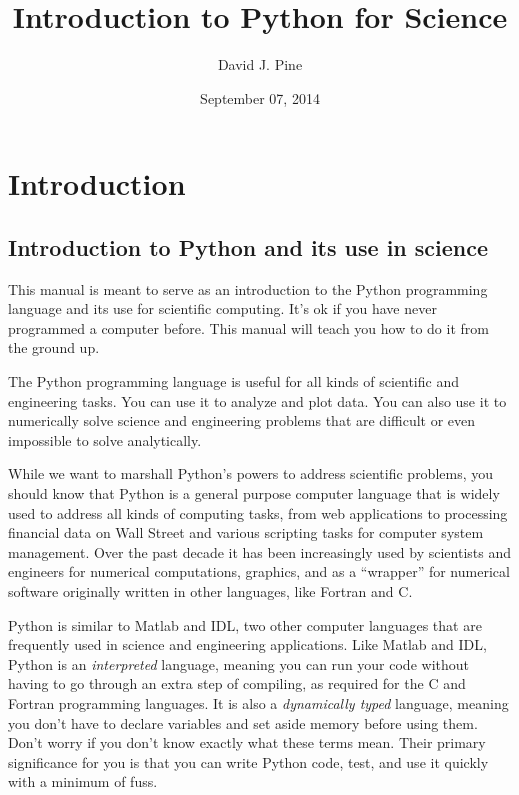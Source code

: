 \documentclass[letterpaper,10pt,english]{sphinxmanual}
\title{Introduction to Python for Science}
\date{September 07, 2014}
\author{David J. Pine}
\begin{document}
\maketitle
\tableofcontents
{}\label{latex-contents::doc}



\chapter{Introduction}
\label{chap1/chap1_intro:introduction}\label{chap1/chap1_intro:welcome-to-pyman-s-documentation}\label{chap1/chap1_intro::doc}

\section{Introduction to Python and its use in science}
\label{chap1/chap1_intro:introduction-to-python-and-its-use-in-science}
This manual is meant to serve as an introduction to the Python programming language and its use for scientific computing.  It's ok if you have never programmed a computer before.  This manual will teach you how to do it from the ground up.

The Python programming language is useful for all kinds of scientific and engineering tasks.  You can use it to analyze and plot data.  You can also use it to numerically solve science and engineering problems that are difficult or even impossible to solve analytically.

While we want to marshall Python's powers to address scientific problems, you should know that Python is a general purpose computer language that is widely used to address all kinds of computing tasks, from web applications to processing financial data on Wall Street and various scripting tasks for computer system management.  Over the past decade it has been increasingly used by scientists and engineers for numerical computations, graphics, and as a ``wrapper'' for numerical software originally written in other languages, like Fortran and C.

Python is similar to Matlab and IDL, two other computer languages that are frequently used in science and engineering applications.  Like Matlab and IDL, Python is an \emph{interpreted} language, meaning you can run your code without having to go through an extra step of compiling, as required for the C and Fortran programming languages.  It is also a \emph{dynamically typed} language, meaning you don't have to declare variables and set aside memory before using them. Don't worry if you don't know exactly what these terms mean. Their primary significance for you is that you can write Python code, test, and use it quickly with a minimum of fuss.
\end{document}
